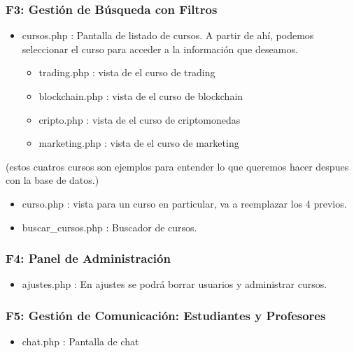 \documentclass[
]{article}
\providecommand{\tightlist}{%
  \setlength{\itemsep}{0pt}\setlength{\parskip}{0pt}}
\begin{document}
\subsubsection{F3: Gestión de Búsqueda con
Filtros}\label{f3-gestiuxf3n-de-buxfasqueda-con-filtros}

\begin{itemize}
\item
  cursos.php : Pantalla de listado de cursos. A partir de ahí, podemos
  seleccionar el curso para acceder a la información que deseamos.

  \begin{itemize}
  \item
    trading.php : vista de el curso de trading
  \item
    blockchain.php : vista de el curso de blockchain
  \item
    cripto.php : vista de el curso de criptomonedas
  \item
    marketing.php : vista de el curso de marketing
  \end{itemize}
\end{itemize}

(estos cuatros cursos son ejemplos para entender lo que queremos hacer
despues con la base de datos.)

\begin{itemize}
\item
  curso.php : vista para un curso en particular, va a reemplazar los 4
  previos.
\item
  buscar\_cursos.php : Buscador de cursos.
\end{itemize}

\subsubsection{F4: Panel de
Administración}\label{f4-panel-de-administraciuxf3n}

\begin{itemize}
\tightlist
\item
  ajustes.php : En ajustes se podrá borrar usuarios y administrar
  cursos.
\end{itemize}

\subsubsection{F5: Gestión de Comunicación: Estudiantes y
Profesores}\label{f5-gestiuxf3n-de-comunicaciuxf3n-estudiantes-y-profesores}

\begin{itemize}
\tightlist
\item
  chat.php : Pantalla de chat
\end{itemize}
\end{document}
